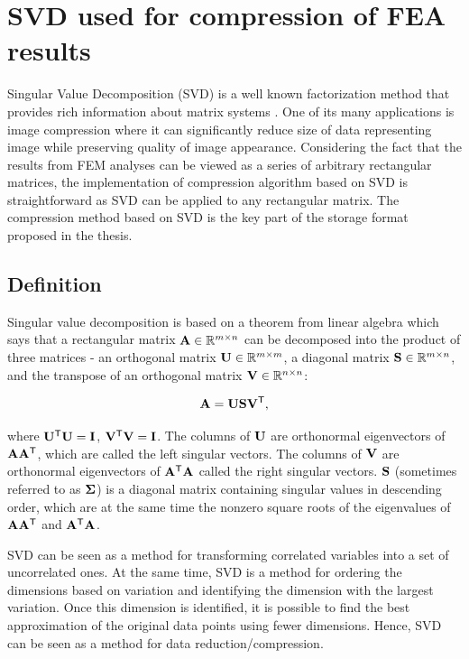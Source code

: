 \chapter{SVD used for compression of FEA results}

Singular Value Decomposition (SVD) is a well known factorization method that provides rich information about matrix systems \cite{Baker2005, Kalman1996, Golub1996, Duintjer2012}. One of its many applications is image compression where it can significantly reduce size of data representing image while preserving quality of image appearance. Considering the fact that the results from FEM analyses can be viewed as a series of arbitrary rectangular matrices, the implementation of compression algorithm based on SVD is straightforward as SVD can be applied to any rectangular matrix. The compression method based on SVD is the key part of the storage format proposed in the thesis.


\section{Definition}

Singular value decomposition is based on a theorem from linear algebra which says that a rectangular matrix $\mathbf{A} \in \mathbb{R}^{m \times n}$ can be decomposed into the product of three matrices - an orthogonal matrix $\mathbf{U} \in \mathbb{R}^{m \times m}$, a diagonal
matrix $\mathbf{S} \in \mathbb{R}^{m \times n}$, and the transpose of an orthogonal matrix $\mathbf{V} \in \mathbb{R}^{n \times n}$:

\begin{equation}
\mathbf{A} = \mathbf{U} \mathbf{S} \mathbf{V}^\mathsf{T},
\label{eq:svd-def}
\end{equation}

\noindent
where $\mathbf{U^\mathsf{T}U} = \mathbf{I}$, $\mathbf{V^\mathsf{T}V} = \mathbf{I}$. The columns of $\mathbf{U}$ are orthonormal eigenvectors of $\mathbf{AA^\mathsf{T}}$, which are called the left singular vectors. The columns of $\mathbf{V}$ are orthonormal eigenvectors of $\mathbf{A^\mathsf{T}A}$ called the right singular vectors. $\mathbf{S}$ (sometimes referred to as $\mathbf{\Sigma}$) is a diagonal matrix containing singular values in descending order, which are at the same time the nonzero square roots of the eigenvalues of $\mathbf{AA^\mathsf{T}}$ and $\mathbf{A^\mathsf{T}A}$.

SVD can be seen as a method for transforming correlated variables into a set of uncorrelated ones. At the same time, SVD is a method for ordering the dimensions based on variation and identifying the dimension with the largest variation. Once this dimension is identified, it is possible to find the best approximation of the original data points using fewer dimensions. Hence, SVD can be seen as a method for data reduction/compression.

